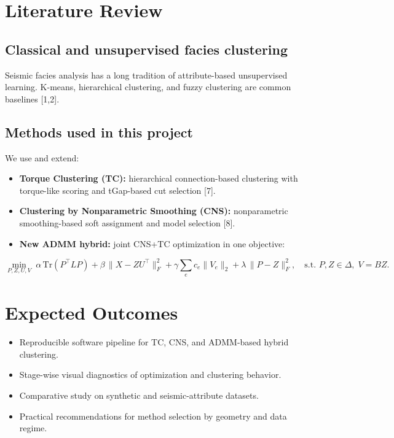 \documentclass[11pt,a4paper]{article}
\begin{document}
\section*{Literature Review}
\subsection*{Classical and unsupervised facies clustering}
Seismic facies analysis has a long tradition of attribute-based unsupervised learning. K-means, hierarchical clustering, and fuzzy clustering are common baselines [1,2].

\subsection*{Methods used in this project}
We use and extend:
\begin{itemize}[leftmargin=1.2em]
    \item \textbf{Torque Clustering (TC):} hierarchical connection-based clustering with torque-like scoring and tGap-based cut selection [7].
    \item \textbf{Clustering by Nonparametric Smoothing (CNS):} nonparametric smoothing-based soft assignment and model selection [8].
    \item \textbf{New ADMM hybrid:} joint CNS+TC optimization in one objective:
\end{itemize}

\[
\min_{P,Z,U,V}\;\alpha\,\mathrm{Tr}(P^\top L P)
+\beta\,\|X-ZU^\top\|_F^2
+\gamma\sum_e c_e\|V_e\|_2
+\lambda\,\|P-Z\|_F^2,
\quad \text{s.t. } P,Z\in\Delta,\;V=BZ.
\]

\section*{Expected Outcomes}
\begin{itemize}[leftmargin=1.2em]
    \item Reproducible software pipeline for TC, CNS, and ADMM-based hybrid clustering.
    \item Stage-wise visual diagnostics of optimization and clustering behavior.
    \item Comparative study on synthetic and seismic-attribute datasets.
    \item Practical recommendations for method selection by geometry and data regime.
\end{itemize}
\end{document}
